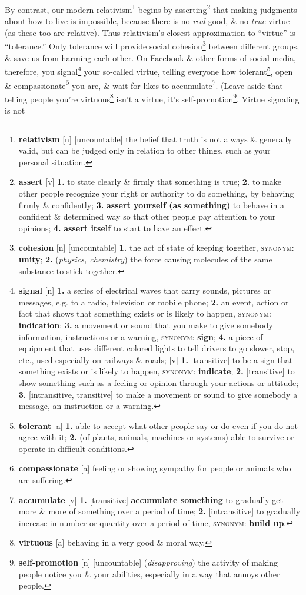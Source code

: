 \documentclass[oneside]{book}
\numberwithin{equation}{section}
\begin{document}
By contrast, our modern relativism\footnote{\textbf{relativism} [n] [uncountable] the belief that truth is not always \& generally valid, but can be judged only in relation to other things, such as your personal situation.} begins by asserting\footnote{\textbf{assert} [v] \textbf{1.} to state clearly \& firmly that something is true; \textbf{2.} to make other people recognize your right or authority to do something, by behaving firmly \& confidently; \textbf{3.} \textbf{assert yourself (as something)} to behave in a confident \& determined way so that other people pay attention to your opinions; \textbf{4.} \textbf{assert itself} to start to have an effect.} that making judgments about how to live is impossible, because there is no \textit{real} good, \& no \textit{true} virtue (as these too are relative). Thus relativism's closest approximation to ``virtue'' is ``tolerance.'' Only tolerance will provide social cohesion\footnote{\textbf{cohesion} [n] [uncountable] \textbf{1.} the act of state of keeping together, \textsc{synonym}: \textbf{unity}; \textbf{2.} (\textit{physics, chemistry}) the force causing molecules of the same substance to stick together.} between different groups, \& save us from harming each other. On Facebook \& other forms of social media, therefore, you signal\footnote{\textbf{signal} [n] \textbf{1.} a series of electrical waves that carry sounds, pictures or messages, e.g. to a radio, television or mobile phone; \textbf{2.} an event, action or fact that shows that something exists or is likely to happen, \textsc{synonym}: \textbf{indication}; \textbf{3.} a movement or sound that you make to give somebody information, instructions or a warning, \textsc{synonym}: \textbf{sign}; \textbf{4.} a piece of equipment that uses different colored lights to tell drivers to go slower, stop, etc., used especially on railways \& roads; [v] \textbf{1.} [transitive] to be a sign that something exists or is likely to happen, \textsc{synonym}: \textbf{indicate}; \textbf{2.} [transitive] to show something such as a feeling or opinion through your actions or attitude; \textbf{3.} [intransitive, transitive] to make a movement or sound to give somebody a message, an instruction or a warning.} your so-called virtue, telling everyone how tolerant\footnote{\textbf{tolerant} [a] \textbf{1.} able to accept what other people say or do even if you do not agree with it; \textbf{2.} (of plants, animals, machines or systems) able to survive or operate in difficult conditions.}, open \& compassionate\footnote{\textbf{compassionate} [a] feeling or showing sympathy for people or animals who are suffering.} you are, \& wait for likes to accumulate\footnote{\textbf{accumulate} [v] \textbf{1.} [transitive] \textbf{accumulate something} to gradually get more \& more of something over a period of time; \textbf{2.} [intransitive] to gradually increase in number or quantity over a period of time, \textsc{synonym}: \textbf{build up}.}. (Leave aside that telling people you're virtuous\footnote{\textbf{virtuous} [a] behaving in a very good \& moral way.} isn't a virtue, it's self-promotion\footnote{\textbf{self-promotion} [n] [uncountable] (\textit{disapproving}) the activity of making people notice you \& your abilities, especially in a way that annoys other people.}. Virtue signaling is not 
\end{document}
